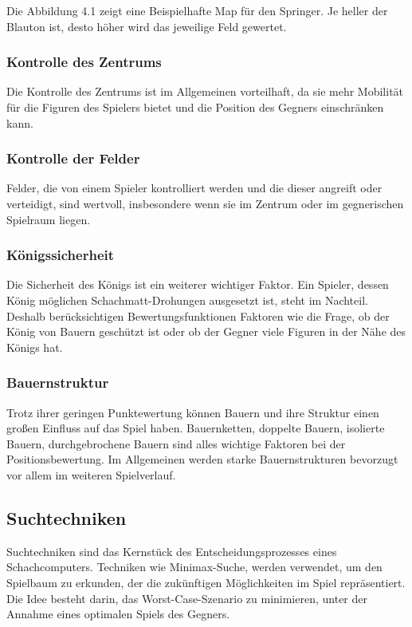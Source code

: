 Die Abbildung 4.1 zeigt eine Beispielhafte Map für den Springer. Je heller der Blauton ist, desto höher wird das jeweilige Feld gewertet.~\cite{Lague_Sebastian_2021_youtube}

\subsubsection{Kontrolle des Zentrums}
Die Kontrolle des Zentrums ist im Allgemeinen vorteilhaft, da sie mehr Mobilität für die Figuren des Spielers 
bietet und die Position des Gegners einschränken kann.

\subsubsection{Kontrolle der Felder}
Felder, die von einem Spieler kontrolliert werden und die dieser angreift oder verteidigt, sind wertvoll, insbesondere wenn sie im Zentrum oder
im gegnerischen Spielraum liegen.

\subsubsection{Königssicherheit}
Die Sicherheit des Königs ist ein weiterer wichtiger Faktor. Ein Spieler, dessen König möglichen Schachmatt-Drohungen ausgesetzt ist, 
steht im Nachteil. Deshalb berücksichtigen Bewertungsfunktionen Faktoren wie die Frage, ob der König von Bauern geschützt ist oder
ob der Gegner viele Figuren in der Nähe des Königs hat.

\subsubsection{Bauernstruktur}
Trotz ihrer geringen Punktewertung können Bauern und ihre Struktur einen großen Einfluss auf das Spiel haben. 
Bauernketten, doppelte Bauern, isolierte Bauern, durchgebrochene Bauern sind alles wichtige Faktoren bei der Positionsbewertung. 
Im Allgemeinen werden starke Bauernstrukturen bevorzugt vor allem im weiteren Spielverlauf.

\subsection{Suchtechniken}
Suchtechniken sind das Kernstück des Entscheidungsprozesses eines Schachcomputers. Techniken wie Minimax-Suche, werden verwendet, um den Spielbaum zu erkunden, 
der die zukünftigen Möglichkeiten im Spiel repräsentiert. Die Idee besteht darin, das Worst-Case-Szenario zu minimieren, 
unter der Annahme eines optimalen Spiels des Gegners.

